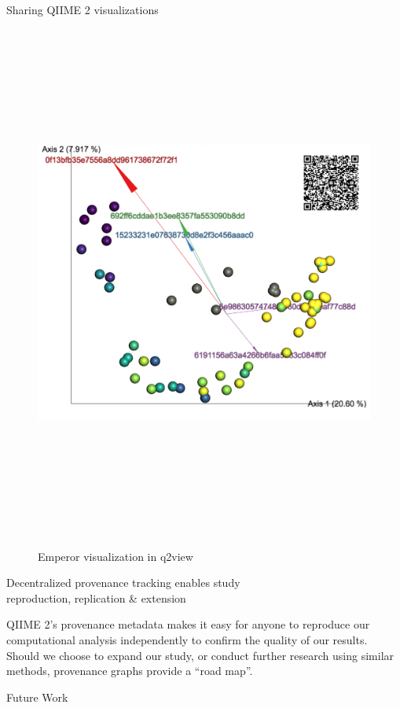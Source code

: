 \documentclass[final]{beamer}
\newlength{\colwidth}
\begin{document}
\begin{frame}[t]
\begin{columns}[t]
\begin{column}{\colwidth}
\begin{block}{Sharing QIIME 2 visualizations}
    \begin{figure}[tph!]
      {\includegraphics[height=17cm]{assets/emperor}}
      \caption{Emperor visualization in q2view}
      \label{fig:emperor}
    \end{figure}

  \end{block}

  \begin{block}{Decentralized provenance tracking enables study \\ reproduction, replication \& extension}

    QIIME 2’s provenance metadata makes it easy for anyone to reproduce our
    computational analysis independently to confirm the quality of our results.
    Should we choose to expand our study, or conduct further research using
    similar methods, provenance graphs provide a “road map”.

  \end{block}

  \begin{block}{Future Work}


\end{block}
\end{column}
\end{columns}
\end{frame}
\end{document}
